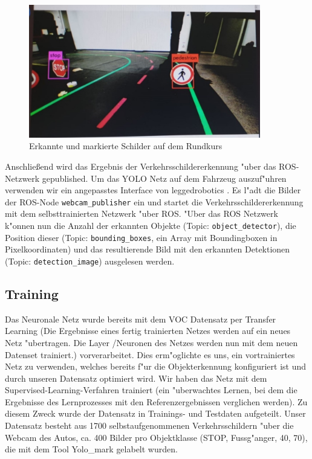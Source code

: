 \begin{figure}[h]
	\centering
	\includegraphics[width=0.9\textwidth,trim={0.5cm 1cm 1cm 1cm},clip]{images/boundingboxes}
	\caption{Erkannte und markierte Schilder auf dem Rundkurs}
	\label{fig:boundingboxes}
\end{figure}

Anschlie\ss end wird das Ergebnis der Verkehrsschildererkennung "uber das ROS-Netzwerk gepublished. Um das YOLO Netz auf dem Fahrzeug auszuf"uhren verwenden wir ein angepasstes Interface von leggedrobotics \cite{leggedrobotics}. Es l"adt die Bilder der ROS-Node \texttt{webcam\_publisher} ein und startet die Verkehrsschildererkennung mit dem selbsttrainierten Netzwerk "uber ROS. "Uber das ROS Netzwerk k"onnen nun die Anzahl der erkannten Objekte (Topic: \texttt{object\_detector}), die Position dieser (Topic: \texttt{bounding\_boxes}, ein Array mit Boundingboxen in Pixelkoordinaten) und das resultierende Bild mit den erkannten Detektionen (Topic: \texttt{detection\_image}) ausgelesen werden.

\subsection{Training}

Das Neuronale Netz wurde bereits mit dem VOC Datensatz
per Transfer Learning (Die Ergebnisse eines fertig trainierten Netzes werden auf ein neues Netz "ubertragen. Die Layer /Neuronen des Netzes werden nun mit dem neuen Datenset trainiert.) vorverarbeitet.
Dies erm"oglichte es uns, ein vortrainiertes Netz zu verwenden, welches bereits f"ur die Objekterkennung konfiguriert ist und durch unseren Datensatz optimiert wird. Wir haben das Netz mit dem Supervised-Learning-Verfahren trainiert (ein "uberwachtes Lernen, bei dem die Ergebnisse des Lernprozesses mit den Referenzergebnissen verglichen werden).  Zu diesem Zweck wurde der Datensatz in Trainings- und Testdaten aufgeteilt. Unser Datensatz besteht aus 1700 selbstaufgenommenen Verkehrsschildern "uber die Webcam des Autos, ca. 400 Bilder pro Objektklasse (STOP, Fussg"anger, 40, 70), die mit dem Tool Yolo\_mark \cite{Yolo_mark} gelabelt wurden.

